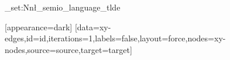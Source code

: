 \begingroup
\ExplSyntaxOn\tl_set:Nn\l_semio_language_tl{de}\ExplSyntaxOff
\begin{VizFigure}[width=80,height=40,title={}]
[appearance=dark]
[data={xy-edges},id={id},iterations={1},labels={false},layout={force},nodes={xy-nodes},source={source},target={target}]
\end{VizFigure}
\endgroup
